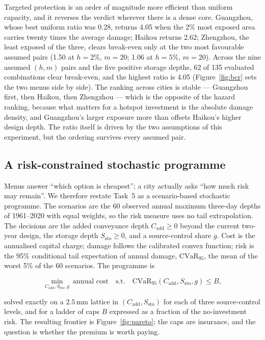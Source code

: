Targeted protection is an order of magnitude more efficient than uniform capacity, and it reverses the verdict wherever there is a dense core. Guangzhou, whose best uniform ratio was 0.28, returns 4.05 when the 2\% most exposed area carries twenty times the average damage; Haikou returns 2.62; Zhengzhou, the least exposed of the three, clears break-even only at the two most favourable assumed pairs (1.50 at $h{=}2\%$, $m{=}20$; 1.06 at $h{=}5\%$, $m{=}20$). Across the nine assumed $(h,m)$ pairs and the five positive storage depths, 62 of 135 evaluated combinations clear break-even, and the highest ratio is 4.05 (Figure~\ref{fig:bcr} sets the two menus side by side). The ranking across cities is stable --- Guangzhou first, then Haikou, then Zhengzhou --- which is the opposite of the hazard ranking, because what matters for a hotspot investment is the absolute damage density, and Guangzhou's larger exposure more than offsets Haikou's higher design depth. The ratio itself is driven by the two assumptions of this experiment, but the ordering survives every assumed pair.

\subsection{A risk-constrained stochastic programme}

Menus answer ``which option is cheapest''; a city actually asks ``how much risk may remain''. We therefore restate Task~5 as a scenario-based stochastic programme. The scenarios are the 60 observed annual maximum three-day depths of 1961--2020 with equal weights, so the risk measure uses no tail extrapolation. The decisions are the added conveyance depth $C_{\text{add}}\ge0$ beyond the current two-year design, the storage depth $S_{\text{sto}}\ge0$, and a source-control share $g$. Cost is the annualised capital charge; damage follows the calibrated convex function; risk is the 95\% conditional tail expectation of annual damage, $\mathrm{CVaR}_{95}$, the mean of the worst 5\% of the 60 scenarios. The programme is

\begin{equation}
\min_{C_{\text{add}},S_{\text{sto}},g}\ \text{annual cost}\quad\text{s.t.}\quad \mathrm{CVaR}_{95}(C_{\text{add}},S_{\text{sto}},g)\le B,
\end{equation}

solved exactly on a $2.5$\,mm lattice in $(C_{\text{add}},S_{\text{sto}})$ for each of three source-control levels, and for a ladder of caps $B$ expressed as a fraction of the no-investment risk. The resulting frontier is Figure~\ref{fig:pareto}; the caps are insurance, and the question is whether the premium is worth paying.

